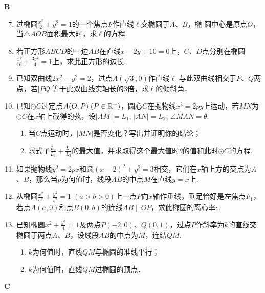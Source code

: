 \begin{center}
    \bfseries B
\end{center}

\begin{enumerate}\setcounter{enumi}{6}
    \item 过椭圆$\frac{x^2}{2}+y^2=1$的一个焦点$F$作直线$\ell$交椭圆于$A$、$B$，椭
    圆中心是原点$O$，当$\triangle AOB$面积最大时，求$\ell$的方程.
    \item 若正方形$ABCD$的一边$AB$在直线$x-2y+10=0$上，$C$、$D$点分别在椭圆$\frac{x^2}{16}+\frac{3y^2}{4}=1$上，求此正方形的边长.
    \item 已知双曲线$2x^2-y^2=2$，过点$A(\sqrt{3},0)$作直线$\ell$ 与此双曲线相交于$P$、$Q$两点，若$|PQ|$等于此双曲线实轴长的3倍，求$\ell$的倾斜角．
    \item 已知$\odot C$过定点$A(O,P)\; (P\in\mathbb{R}^+)$，圆心$C$在抛物线$x^2=2py$上运动，若$MN$为$\odot C$在$x$轴上截得的弦，设$|AM|=L_1$, $|AN|=L_2$, $\angle MAN=\theta$.
\begin{enumerate}[(1)]
 \item 当$C$点运动时，$|MN|$是否变化？写出并证明你的结论；
\item 求式子$\frac{L_2}{L_1}+\frac{L_1}{L_2}$的最大值，并求取得这个最大值时$\theta$的值和此时$\odot C$的方程.
\end{enumerate}

\item 如果抛物线$y^2=2px$和圆$(x-2)^2+y^2=3$相交，它们在$x$轴上方的交点为$A$、$B$，那么当$p$为何值时，线段$AB$的中点$M$在直线$y=x$上.
\item 从椭圆$\frac{x^2}{a^2}+\frac{y^2}{b^2}=1\; (a>b>0)$上一点$P$向$x$轴作垂线，垂足恰好是左焦点$F_1$，若点$A(a,0)$和点$B(0,b)$的连线$AB\parallel OP$，求此椭圆的离心率$e$.
\item 已知椭圆$x^2+\frac{y^2}{4}=1$及两点$P(-2,0)$、$Q(0,1)$，过点$P$作斜率为$k$的直线交椭圆于两点$A$、$B$，设线段$AB$的中点为$M$，连结$QM$.
\begin{enumerate}[(1)]
    \item $k$为何值时，直线$QM$与椭圆的准线平行；
    \item $k$为何值时，直线$QM$过椭圆的顶点．
\end{enumerate}
\end{enumerate}

\begin{center}
    \bfseries C
\end{center}

